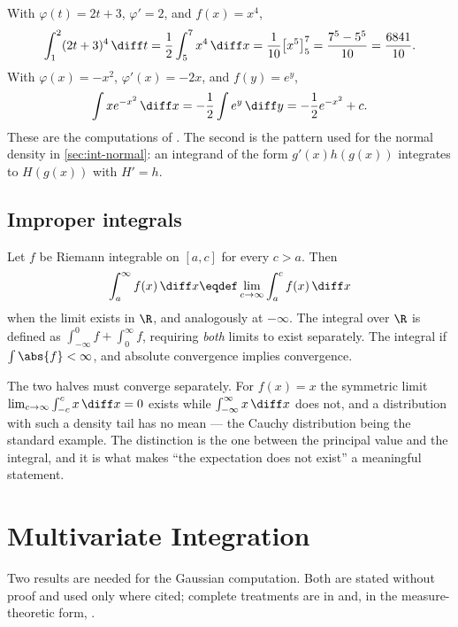 \begin{eg}\label{eg:substitutions}
	With $\varphi(t)=2t+3$, $\varphi'=2$, and $f(x)=x^4$,
	\[
		\int_1^2(2t+3)^4\,\diff t=\frac12\int_5^7x^4\,\diff x
		=\frac{1}{10}\bigl[x^5\bigr]_5^7=\frac{7^5-5^5}{10}=\frac{6841}{10} .
	\]
	With $\varphi(x)=-x^2$, $\varphi'(x)=-2x$, and $f(y)=e^y$,
	\[
		\int xe^{-x^2}\,\diff x=-\frac12\int e^{y}\,\diff y=-\frac12e^{-x^2}+c .
	\]
	These are the computations of \autocite[slides 83--84]{fukuda2026calculus}. The
	second is the pattern used for the normal density in
	\autoref{sec:int-normal}: an integrand of the form $g'(x)h(g(x))$ integrates to
	$H(g(x))$ with $H'=h$.
\end{eg}

\subsection{Improper integrals}

\begin{definition}\label{def:improper}
	Let $f$ be Riemann integrable on $[a,c]$ for every $c>a$. Then
	\[
		\int_a^{\infty}f(x)\,\diff x\eqdef\lim_{c\to\infty}\int_a^cf(x)\,\diff x
	\]
	when the limit exists in $\R$, and analogously at $-\infty$. The integral over
	$\R$ is defined as $\int_{-\infty}^0f+\int_0^{\infty}f$, requiring
	\emph{both} limits to exist separately. The integral  if $\int\abs{f}<\infty$, and absolute
	convergence implies convergence.
\end{definition}

The two halves must converge separately. For
$f(x)=x$ the symmetric limit $\lim_{c\to\infty}\int_{-c}^cx\,\diff x=0$ exists while
$\int_{-\infty}^{\infty}x\,\diff x$ does not, and a distribution with such a density
tail has no mean --- the Cauchy distribution being the standard example. The
distinction is the one between the principal value and the integral, and
it is what makes ``the expectation does not exist'' a meaningful statement.

\section{Multivariate Integration}\label{sec:int-multi}

Two results are needed for the Gaussian computation. Both are stated without
proof and used only where cited; complete treatments are in
\textcite[Ch.~10]{rudin1976principles} and, in the measure-theoretic form,
\textcite[Ch.~5]{legall2022measure}.

